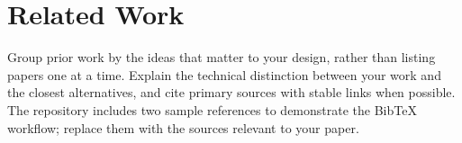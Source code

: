 \section{Related Work}
\label{sec:related-work}

Group prior work by the ideas that matter to your design, rather than listing
papers one at a time. Explain the technical distinction between your work and
the closest alternatives, and cite primary sources with stable links when
possible. The repository includes two sample references to demonstrate the
BibTeX workflow; replace them with the sources relevant to your paper.
